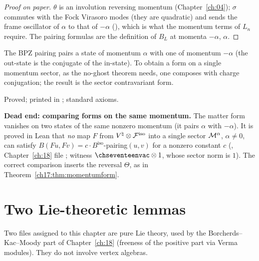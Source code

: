 \begin{proof}[Proof on paper]
$\theta$ is an involution reversing momentum (Chapter~\ref{ch:04}); $\sigma$ commutes with the Fock Virasoro modes (they are
quadratic) and sends the frame oscillator of $\alpha$ to that of $-\alpha$ (), which is what the
momentum terms of $L_n$ require.  The pairing formulas are the definition of $B_L$ at momenta $-\alpha$, $\alpha$.
\end{proof}

\begin{physics}
The BPZ pairing pairs a state of momentum $\alpha$ with one of momentum $-\alpha$ (the out-state is the conjugate of the in-state).
To obtain a form on a single momentum sector, as the no-ghost theorem needs, one composes with charge conjugation; the
result is the sector contravariant form.
\end{physics}

\begin{status}
Proved; printed in ; standard axioms.
\end{status}

\begin{warning}
\textbf{Dead end: comparing forms on the same momentum.}  The matter form vanishes on two states of the same nonzero
momentum (it pairs $\alpha$ with $-\alpha$).  It is proved in Lean that \emph{no} map $F$ from ${V^{\natural}}\otimes\mathcal{F}^{\mathrm{iso}}$ into a
single sector $\mathcal{M}^\alpha$, $\alpha\neq0$, can satisfy $B(Fu,Fv)=c\cdot B^{\mathrm{iso}}$-pairing$(u,v)$ for a nonzero constant $c$
(, Chapter~\ref{ch:18} file
; witness $\chseventeenvac\otimes1$, whose sector norm is $1$).  The
correct comparison inserts the reversal $\Theta$, as in Theorem~\ref{ch17:thm:momentumform}.
\end{warning}

\section{Two Lie-theoretic lemmas}\label{ch17:sec:lie}

Two files assigned to this chapter are pure Lie theory, used by the Borcherds--Kac--Moody part of Chapter~\ref{ch:18}
(freeness of the positive part via Verma modules).  They do not involve vertex algebras.


